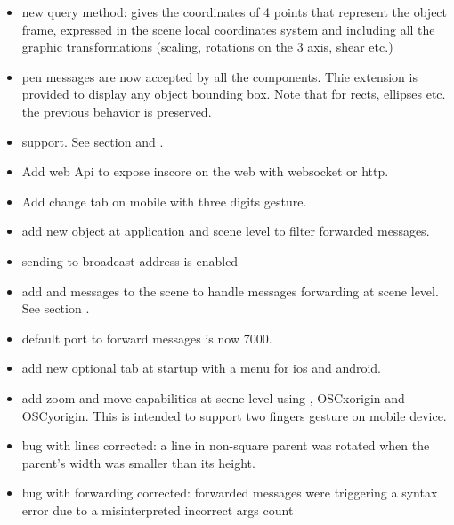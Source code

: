 

\begin{itemize}
\item new  query method:  gives the coordinates of 4 points that represent the 
  object frame, expressed in the scene local coordinates system and including all the graphic 
  transformations (scaling, rotations on the 3 axis, shear etc.)
\item pen messages are now accepted by all the components. Thie extension is provided to display
  any object bounding box. Note that for rects, ellipses etc. the previous behavior is preserved.
\item {} support. See section  and .
\item Add web Api to expose inscore on the web with websocket or http.
\item Add change tab on mobile with three digits gesture.
\item add new object  at application and scene level to filter forwarded messages.
\item sending to broadcast address is enabled
\item add  and  messages to the scene to handle messages forwarding at scene level. See section .
\item default port to forward messages is now 7000.
\item add new optional tab at startup with a menu for ios and android.
\item add zoom and move capabilities at scene level using , OSC{xorigin} and OSC{yorigin}. This is intended to support two fingers gesture on mobile device.
\item bug with lines corrected: a line in non-square parent was rotated when the parent's width 
  was smaller than its height.
\item bug with  forwarding corrected: forwarded messages were triggering a syntax error due to 
  a misinterpreted incorrect args count 
\end{itemize}


